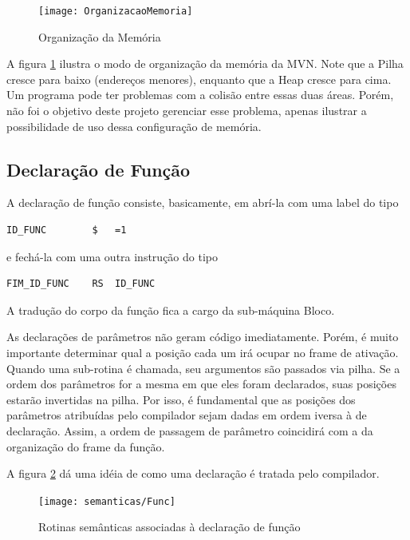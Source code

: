 \documentclass[a4paper,12pt]{report}
\begin{document}
    \begin{figure}[h]
        \centering
        \caption{Organização da Memória}
        \label{fig:OrgMem}
        \texttt{[image: OrganizacaoMemoria]}
    \end{figure}

    A figura \ref{fig:OrgMem} ilustra o modo de organização da memória da MVN.
    Note que a Pilha cresce para baixo (endereços menores), enquanto que a Heap cresce para cima. Um programa pode ter problemas com a colisão entre essas duas áreas. Porém, não foi o objetivo deste projeto gerenciar esse problema, apenas ilustrar a possibilidade de uso dessa configuração de memória.

    \subsection*{Declaração de Função}

    A declaração de função consiste, basicamente, em abrí-la com uma label do tipo
    \begin{lstlisting}[frame=none,numbers=none]
    ID_FUNC        $   =1
    \end{lstlisting}
    e fechá-la com uma outra instrução do tipo
    \begin{lstlisting}[frame=none,numbers=none]
    FIM_ID_FUNC    RS  ID_FUNC
    \end{lstlisting}

    A tradução do corpo da função fica a cargo da sub-máquina Bloco.

    As declarações de parâmetros não geram código imediatamente. Porém, é muito importante determinar qual a posição cada um irá ocupar no frame de ativação. Quando uma sub-rotina é chamada, seu argumentos são passados via pilha. Se a ordem dos parâmetros for a mesma em que eles foram declarados, suas posições estarão invertidas na pilha. Por isso, é fundamental que as posições dos parâmetros atribuídas pelo compilador sejam dadas em ordem iversa à de declaração. Assim, a ordem de passagem de parâmetro coincidirá com a da organização do frame da função.

    A figura \ref{fig:FuncSem} dá uma idéia de como uma declaração é tratada pelo compilador.


    \begin{figure}[h]
        \caption{Rotinas semânticas associadas à declaração de função}
        \label{fig:FuncSem}
        \texttt{[image: semanticas/Func]}
    \end{figure}
\end{document}
